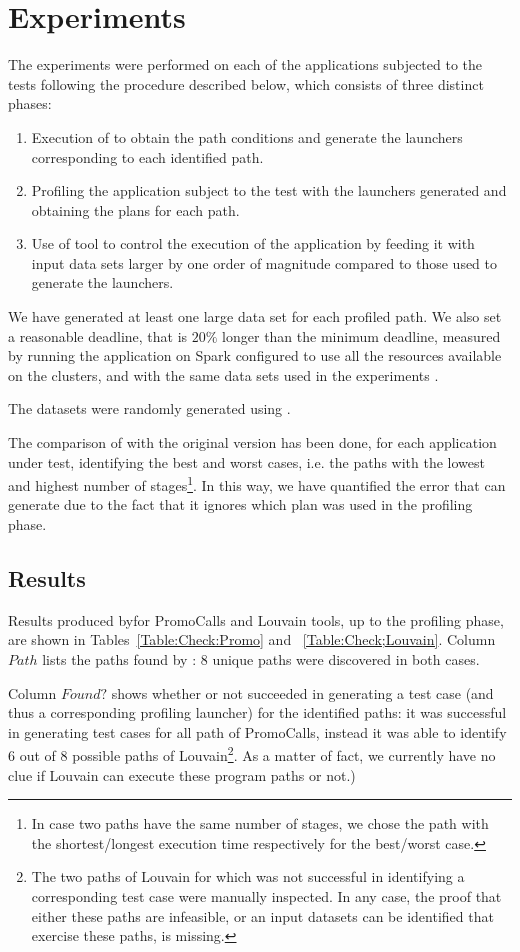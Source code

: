 \section{Experiments}\label{sec:experiments}
The experiments were performed on each of the applications subjected to the tests following the procedure described below, which consists of three distinct phases:
\begin{enumerate}[$1 $]
	\item Execution of \dSymb to obtain the path conditions and generate the launchers corresponding to each identified path.
	\item Profiling the application subject to the test with the launchers generated and obtaining the plans for each path.
	\item Use of tool to control the execution of the application by feeding it with input data sets larger by one order of magnitude compared to those used to generate the launchers.
\end{enumerate}
We have generated at least one large data set for each profiled path. We also set a reasonable deadline, that is $ 20\% $ longer than the minimum deadline, measured by running the application on Spark configured to use all the resources available on the clusters, and with the same data sets used in the experiments .

The datasets were randomly generated using \dSymb.

The comparison of \tool with the original \cSpark version has been done, for each application under test, identifying the best and worst cases, i.e. the paths with the lowest and highest number of stages\footnote{In case two paths have the same number of stages, we chose the path with the shortest/longest execution time  respectively for the best/worst case.}. In this way, we have quantified the error that \cSpark can generate due to the fact that it ignores which plan was used in the profiling phase.

\subsection{Results}
Results produced by\tool for PromoCalls and Louvain tools, up to the profiling phase, are shown in Tables~\ref{Table:Check:Promo} and ~\ref{Table:Check;Louvain}. Column $Path$ lists the paths found by \dSymb: $8$ unique paths were discovered in both cases. 

Column $Found?$ shows whether or not \dSymb succeeded in generating a test case (and thus a corresponding profiling launcher) for the identified paths: it was successful in generating test cases for all path of PromoCalls, instead it was able to identify 6 out of 8 possible paths of Louvain\footnote{The two paths of Louvain for which \dSymb was not successful in identifying a corresponding test case were manually inspected. In any case, the proof that either these paths are infeasible, or an input datasets can be identified that exercise these paths, is missing.}. As a matter of fact, we currently have no clue if Louvain can execute these program paths or not.)


